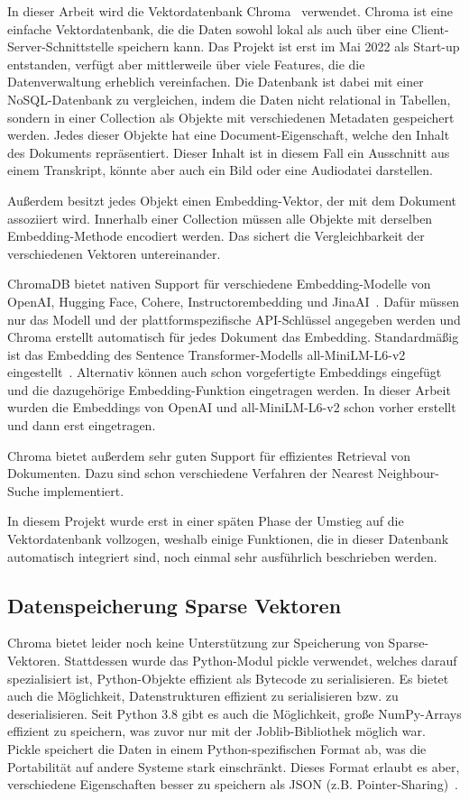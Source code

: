 In dieser Arbeit wird die Vektordatenbank Chroma~\cite{zotero-559} verwendet.
Chroma ist eine einfache Vektordatenbank, die die Daten sowohl lokal als auch über eine Client-Server-Schnittstelle speichern kann.
Das Projekt ist erst im Mai 2022 als Start-up entstanden, verfügt aber mittlerweile über viele Features, die die Datenverwaltung erheblich vereinfachen.
Die Datenbank ist dabei mit einer NoSQL-Datenbank zu vergleichen, indem die Daten nicht relational in Tabellen, sondern in einer Collection als Objekte mit verschiedenen Metadaten gespeichert werden.
Jedes dieser Objekte hat eine Document-Eigenschaft, welche den Inhalt des Dokuments repräsentiert.
Dieser Inhalt ist in diesem Fall ein Ausschnitt aus einem Transkript, könnte aber auch ein Bild oder eine Audiodatei darstellen.

Außerdem besitzt jedes Objekt einen Embedding-Vektor, der mit dem Dokument assoziiert wird.
Innerhalb einer Collection müssen alle Objekte mit derselben Embedding-Methode encodiert werden.
Das sichert die Vergleichbarkeit der verschiedenen Vektoren untereinander.

ChromaDB bietet nativen Support für verschiedene Embedding-Modelle von OpenAI, Hugging Face, Cohere, Instructorembedding und JinaAI~\cite{chroma}.
Dafür müssen nur das Modell und der plattformspezifische API-Schlüssel angegeben werden und Chroma erstellt automatisch für jedes Dokument das Embedding.
Standardmäßig ist das Embedding des Sentence Transformer-Modells all-MiniLM-L6-v2 eingestellt~\cite{chroma}.
Alternativ können auch schon vorgefertigte Embeddings eingefügt und die dazugehörige Embedding-Funktion eingetragen werden.
In dieser Arbeit wurden die Embeddings von OpenAI und all-MiniLM-L6-v2 schon vorher erstellt und dann erst eingetragen.

Chroma bietet außerdem sehr guten Support für effizientes Retrieval von Dokumenten.
Dazu sind schon verschiedene Verfahren der Nearest Neighbour-Suche implementiert.

In diesem Projekt wurde erst in einer späten Phase der Umstieg auf die Vektordatenbank vollzogen, weshalb einige Funktionen, die in dieser Datenbank automatisch integriert sind, noch einmal sehr ausführlich beschrieben werden.

\subsection{Datenspeicherung Sparse Vektoren}

Chroma bietet leider noch keine Unterstützung zur Speicherung von Sparse-Vektoren.
Stattdessen wurde das Python-Modul pickle verwendet, welches darauf spezialisiert ist, Python-Objekte effizient als Bytecode zu serialisieren.
Es bietet auch die Möglichkeit, Datenstrukturen effizient zu serialisieren bzw. zu deserialisieren.
Seit Python 3.8 gibt es auch die Möglichkeit, große NumPy-Arrays effizient zu speichern, was zuvor nur mit der Joblib-Bibliothek möglich war.
Pickle speichert die Daten in einem Python-spezifischen Format ab, was die Portabilität auf andere Systeme stark einschränkt.
Dieses Format erlaubt es aber, verschiedene Eigenschaften besser zu speichern als JSON (z.B. Pointer-Sharing)~\cite{pickle}.

